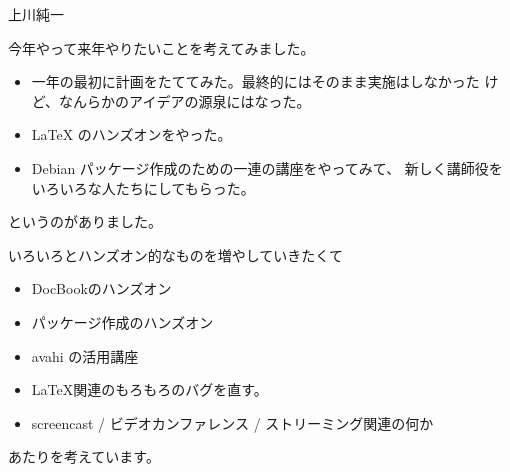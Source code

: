 
\begin{prework}{上川純一}

今年やって来年やりたいことを考えてみました。


\begin{itemize}
 \item 一年の最初に計画をたててみた。最終的にはそのまま実施はしなかった
       けど、なんらかのアイデアの源泉にはなった。
 \item \LaTeX{} のハンズオンをやった。
 \item Debian パッケージ作成のための一連の講座をやってみて、
       新しく講師役をいろいろな人たちにしてもらった。
\end{itemize}
というのがありました。


いろいろとハンズオン的なものを増やしていきたくて

\begin{itemize}
 \item DocBookのハンズオン
 \item パッケージ作成のハンズオン
 \item avahi の活用講座
 \item \LaTeX{}関連のもろもろのバグを直す。
 \item screencast / ビデオカンファレンス / ストリーミング関連の何か
\end{itemize}
あたりを考えています。

\end{prework}

